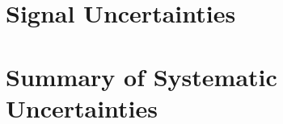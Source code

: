 \documentclass[edeposit,fullpage]{latex/uiucthesis2009}
\begin{document}
\section{Signal Uncertainties}
\section{Summary of Systematic Uncertainties}
\end{document}
